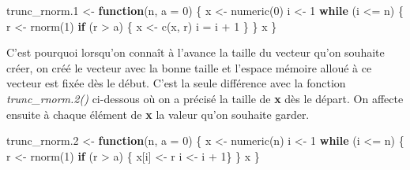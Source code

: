 \documentclass[
]{book}
\newenvironment{Shaded}{\begin{snugshade}}{\end{snugshade}}
\newcommand{\AttributeTok}[1]{\textcolor[rgb]{0.77,0.63,0.00}{#1}}
\newcommand{\ControlFlowTok}[1]{\textcolor[rgb]{0.13,0.29,0.53}{\textbf{#1}}}
\newcommand{\DecValTok}[1]{\textcolor[rgb]{0.00,0.00,0.81}{#1}}
\newcommand{\FloatTok}[1]{\textcolor[rgb]{0.00,0.00,0.81}{#1}}
\newcommand{\FunctionTok}[1]{\textcolor[rgb]{0.00,0.00,0.00}{#1}}
\newcommand{\NormalTok}[1]{#1}
\newcommand{\OtherTok}[1]{\textcolor[rgb]{0.56,0.35,0.01}{#1}}
\newcommand{\SpecialCharTok}[1]{\textcolor[rgb]{0.00,0.00,0.00}{#1}}
\theoremstyle{definition}
\theoremstyle{definition}
\theoremstyle{definition}
\theoremstyle{definition}
\theoremstyle{remark}
\begin{document}
\begin{Shaded}
\begin{Highlighting}[]
\NormalTok{trunc\_rnorm}\FloatTok{.1} \OtherTok{\textless{}{-}} \ControlFlowTok{function}\NormalTok{(n, }\AttributeTok{a =} \DecValTok{0}\NormalTok{) \{}
\NormalTok{  x }\OtherTok{\textless{}{-}} \FunctionTok{numeric}\NormalTok{(}\DecValTok{0}\NormalTok{)}
\NormalTok{  i }\OtherTok{\textless{}{-}} \DecValTok{1}
  \ControlFlowTok{while}\NormalTok{ (i }\SpecialCharTok{\textless{}=}\NormalTok{ n) \{}
\NormalTok{    r }\OtherTok{\textless{}{-}} \FunctionTok{rnorm}\NormalTok{(}\DecValTok{1}\NormalTok{)}
    \ControlFlowTok{if}\NormalTok{ (r }\SpecialCharTok{\textgreater{}}\NormalTok{ a) \{}
\NormalTok{      x }\OtherTok{\textless{}{-}} \FunctionTok{c}\NormalTok{(x, r)}
\NormalTok{      i }\OtherTok{=}\NormalTok{ i }\SpecialCharTok{+} \DecValTok{1}
\NormalTok{    \}}
\NormalTok{  \}}
\NormalTok{ x}
\NormalTok{\}  }
\end{Highlighting}
\end{Shaded}

C'est pourquoi lorsqu'on connaît à l'avance la taille du vecteur qu'on souhaite créer, on créé le vecteur avec la bonne taille et l'espace mémoire alloué à ce vecteur est fixée dès le début. C'est la seule différence avec la fonction \emph{trunc\_rnorm.2()} ci-dessous où on a précisé la taille de \textbf{x} dès le départ. On affecte ensuite à chaque élément de \textbf{x} la valeur qu'on souhaite garder.

\begin{Shaded}
\begin{Highlighting}[]
\NormalTok{trunc\_rnorm}\FloatTok{.2} \OtherTok{\textless{}{-}} \ControlFlowTok{function}\NormalTok{(n, }\AttributeTok{a =} \DecValTok{0}\NormalTok{) \{}
\NormalTok{  x }\OtherTok{\textless{}{-}} \FunctionTok{numeric}\NormalTok{(n)}
\NormalTok{  i }\OtherTok{\textless{}{-}} \DecValTok{1}
  \ControlFlowTok{while}\NormalTok{ (i }\SpecialCharTok{\textless{}=}\NormalTok{ n) \{}
\NormalTok{    r }\OtherTok{\textless{}{-}} \FunctionTok{rnorm}\NormalTok{(}\DecValTok{1}\NormalTok{)}
    \ControlFlowTok{if}\NormalTok{ (r }\SpecialCharTok{\textgreater{}}\NormalTok{ a) \{}
\NormalTok{      x[i] }\OtherTok{\textless{}{-}}\NormalTok{ r}
\NormalTok{      i }\OtherTok{\textless{}{-}}\NormalTok{ i }\SpecialCharTok{+} \DecValTok{1}\NormalTok{\}}
\NormalTok{    \}}
\NormalTok{  x}
\NormalTok{\}  }
\end{Highlighting}
\end{Shaded}
\end{document}
